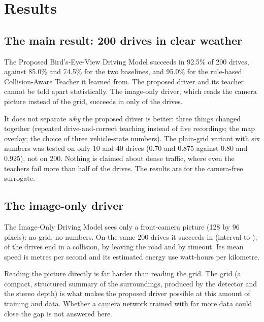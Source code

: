\section{Results}

\subsection{The main result: 200 drives in clear weather}
\begin{plainwords}
The Proposed Bird's-Eye-View Driving Model succeeds in 92.5\% of 200 drives, against 85.0\% and 74.5\% for the two baselines, and 95.0\% for the rule-based Collision-Aware Teacher it learned from. The proposed driver and its teacher cannot be told apart statistically. The image-only driver, which reads the camera picture instead of the grid, succeeds in only \ImOnSuccess{} of the drives.
\end{plainwords}



\begin{cautionbox}
It does not separate \emph{why} the proposed driver is better: three things changed together (repeated drive-and-correct teaching instead of five recordings; the map overlay; the choice of three vehicle-state numbers). The plain-grid variant with six numbers was tested on only 10 and 40 drives (0.70 and 0.875 against 0.80 and 0.925), not on 200. Nothing is claimed about dense traffic, where even the teachers fail more than half of the drives. The results are for the camera-free surrogate.
\end{cautionbox}

\subsection{The image-only driver}
The Image-Only Driving Model sees only a front-camera picture (128 by 96 pixels): no grid, no numbers. On the same 200 drives it succeeds in \ImOnSuccess{} (interval \ImOnLow{} to \ImOnHigh{}); \ImOnCollision{} of the drives end in a collision, \ImOnOffroad{} by leaving the road and \ImOnTimeout{} by timeout. Its mean speed is \ImOnSpeed{} metres per second and its estimated energy use \ImOnEnergy{} watt-hours per kilometre.
\begin{implicationbox}
Reading the picture directly is far harder than reading the grid. The grid (a compact, structured summary of the surroundings, produced by the detector and the stereo depth) is what makes the proposed driver possible at this amount of training and data. Whether a camera network trained with far more data could close the gap is not answered here.
\end{implicationbox}

